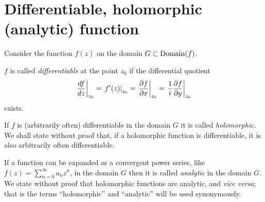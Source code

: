 {\eexample
}



\section{Differentiable, holomorphic (analytic) function}

Consider the function $f(z)$ on the domain $G\subset {\rm Domain}(f)$.

$f$ is called {\em differentiable} at the point $z_0$ if the  differential quotient
\begin{equation}
\left. {df\over dz}\right|_{z_0}=
\left. f'(z)\right|_{z_0} =
\left. {\partial f\over \partial  x}\right|_{z_0} =
\left. {1\over i}{\partial f\over \partial y}\right|_{z_0}
\end{equation}
 exists.



If $f$ is (arbitrarily often) differentiable in the  domain $G$ it is called {\em holomorphic.}
We shall state without proof that, if a holomorphic function is differentiable, it is also arbitrarily often differentiable.

If a function  can be expanded as a convergent power series, like $f (z) = \sum_{n=0}^\infty a_n z^n$, in the  domain $G$ then it is called
{\em analytic} in the domain $G$.
We state without proof that holomorphic functions are analytic, and {\it vice versa};
that is the terms ``holomorphic'' and ``analytic'' will be used synonymously.




